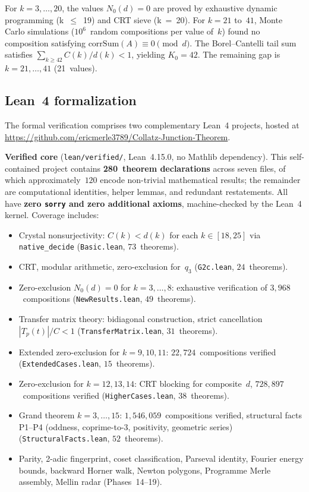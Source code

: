 \documentclass[12pt, a4paper]{amsart}
\theoremstyle{plain}
\theoremstyle{definition}
\theoremstyle{remark}
\newcommand{\corrSum}{\mathrm{corrSum}}
\begin{document}
\noindent
For $k = 3, \ldots, 20$, the values $N_0(d) = 0$ are
proved by exhaustive dynamic programming (k~$\leq$~19)
and CRT sieve (k~=~20). For $k = 21$ to~$41$,
Monte Carlo simulations ($10^6$~random compositions
per value of~$k$) found no composition satisfying
$\corrSum(A) \equiv 0 \pmod{d}$. The Borel--Cantelli
tail sum satisfies $\sum_{k \geq 42} C(k)/d(k) < 1$,
yielding $K_0 = 42$. The remaining gap is
$k = 21, \ldots, 41$ (21~values).

\subsection{Lean~4 formalization}\label{ssec:lean}

The formal verification comprises two complementary Lean~4
projects, hosted at
\url{https://github.com/ericmerle3789/Collatz-Junction-Theorem}.

\medskip\noindent
\textbf{Verified core}
(\texttt{lean/verified/}, Lean~4.15.0, no Mathlib dependency).
This self-contained project contains \textbf{280~theorem
declarations} across seven files, of which
approximately~$120$ encode non-trivial
mathematical results; the remainder are computational
identities, helper lemmas, and redundant restatements.
All have \textbf{zero \texttt{sorry} and zero additional
axioms}, machine-checked by the Lean~4 kernel.
Coverage includes:
\begin{itemize}
  \item Crystal nonsurjectivity: $C(k) < d(k)$ for each
    $k \in [18, 25]$ via \texttt{native\_decide}
    (\texttt{Basic.lean}, $73$~theorems).
  \item CRT, modular arithmetic, zero-exclusion for~$q_3$
    (\texttt{G2c.lean}, $24$~theorems).
  \item Zero-exclusion $N_0(d) = 0$ for $k = 3, \ldots, 8$:
    exhaustive verification of $3{,}968$~compositions
    (\texttt{NewResults.lean}, $49$~theorems).
  \item Transfer matrix theory: bidiagonal construction,
    strict cancellation $|T_p(t)|/C < 1$
    (\texttt{TransferMatrix.lean}, $31$~theorems).
  \item Extended zero-exclusion for $k = 9, 10, 11$:
    $22{,}724$~compositions verified
    (\texttt{ExtendedCases.lean}, $15$~theorems).
  \item Zero-exclusion for $k = 12, 13, 14$:
    CRT blocking for composite~$d$,
    $728{,}897$~compositions verified
    (\texttt{HigherCases.lean}, $38$~theorems).
  \item Grand theorem $k = 3, \ldots, 15$:
    $1{,}546{,}059$~compositions verified,
    structural facts P1--P4 (oddness, coprime-to-3,
    positivity, geometric series)
    (\texttt{StructuralFacts.lean}, $52$~theorems).
  \item Parity, 2-adic fingerprint, coset classification,
    Parseval identity, Fourier energy bounds,
    backward Horner walk, Newton polygons,
    Programme Merle assembly, Mellin radar
    (Phases~14--19).
\end{itemize}
\end{document}
